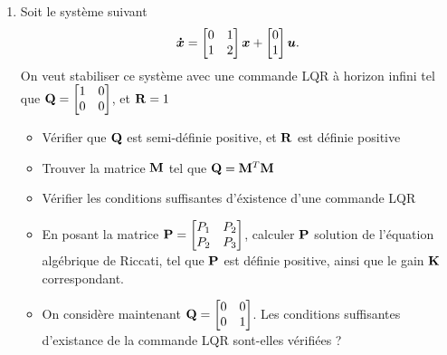 \begin{enumerate}
	\item Soit le système suivant 
	\begin{equation}
		\bm{\dot{x}} = \begin{bmatrix}
			0 & 1 \\ 1 & 2
		\end{bmatrix} \bm{x}+ \begin{bmatrix}
		0 \\ 1
		\end{bmatrix}\bm{u}.
	\end{equation}
	On veut stabiliser ce système avec une commande LQR à horizon infini tel que $\mathbf{Q} = \begin{bmatrix}
		1 & 0 \\ 0 &0 
	\end{bmatrix}$, et $\mathbf{R}=1$
	\begin{itemize}
		\item Vérifier que $\mathbf{Q}$ est semi-définie positive, et $\mathbf{R}$ est définie positive
		\item Trouver la matrice $\mathbf{M}$ tel que $\mathbf{Q} = \mathbf{M}^T\mathbf{M}$
		\item Vérifier les conditions suffisantes d'éxistence d'une commande LQR
		\item En posant la matrice $\mathbf{P}=\begin{bmatrix}
			P_1 & P_2 \\ P_2 & P_3
		\end{bmatrix}$, calculer $\mathbf{P}$ solution de l'équation algébrique de Riccati, tel que $\mathbf{P}$ est définie positive, ainsi que le gain $\mathbf{K}$ correspondant.
		\item On considère maintenant $\mathbf{Q} = \begin{bmatrix}
			0 & 0 \\ 0 &1 
		\end{bmatrix}$. Les conditions suffisantes d'existance de la commande LQR sont-elles vérifiées ?
	\end{itemize}


\end{enumerate}
